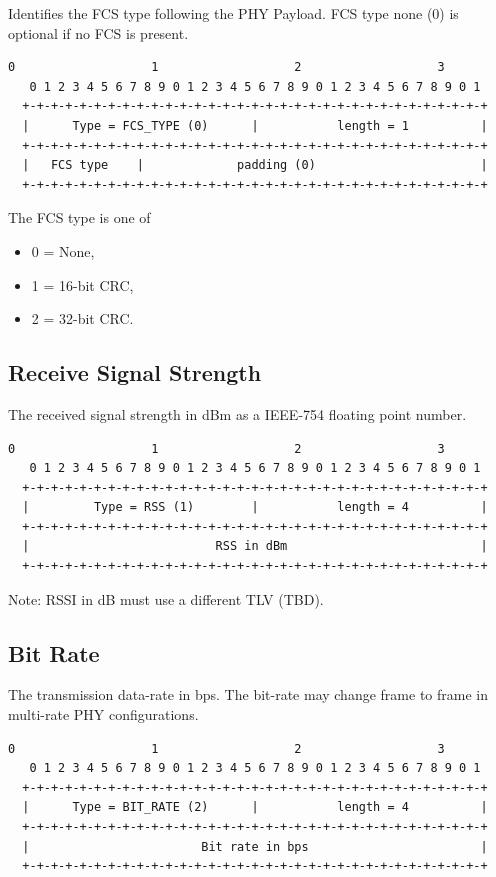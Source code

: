 \documentclass[12pt]{article}
\renewcommand\_{\textunderscore\allowbreak}
\begin{document}
Identifies the FCS type following the PHY Payload.  FCS type none (0) is
optional if no FCS is present.

\begin{Verbatim}[samepage=true]
   0                   1                   2                   3
   0 1 2 3 4 5 6 7 8 9 0 1 2 3 4 5 6 7 8 9 0 1 2 3 4 5 6 7 8 9 0 1
  +-+-+-+-+-+-+-+-+-+-+-+-+-+-+-+-+-+-+-+-+-+-+-+-+-+-+-+-+-+-+-+-+
  |      Type = FCS_TYPE (0)      |           length = 1          |
  +-+-+-+-+-+-+-+-+-+-+-+-+-+-+-+-+-+-+-+-+-+-+-+-+-+-+-+-+-+-+-+-+
  |   FCS type    |             padding (0)                       |
  +-+-+-+-+-+-+-+-+-+-+-+-+-+-+-+-+-+-+-+-+-+-+-+-+-+-+-+-+-+-+-+-+
\end{Verbatim}

The FCS type is one of
    \begin{itemize}
        \item 0 = None,
        \item 1 = 16-bit CRC,
        \item 2 = 32-bit CRC.
    \end{itemize}

\subsection{Receive Signal Strength}
The received signal strength in dBm as a IEEE-754 floating point number.

\begin{Verbatim}[samepage=true]
   0                   1                   2                   3
   0 1 2 3 4 5 6 7 8 9 0 1 2 3 4 5 6 7 8 9 0 1 2 3 4 5 6 7 8 9 0 1
  +-+-+-+-+-+-+-+-+-+-+-+-+-+-+-+-+-+-+-+-+-+-+-+-+-+-+-+-+-+-+-+-+
  |         Type = RSS (1)        |           length = 4          |
  +-+-+-+-+-+-+-+-+-+-+-+-+-+-+-+-+-+-+-+-+-+-+-+-+-+-+-+-+-+-+-+-+
  |                          RSS in dBm                           |
  +-+-+-+-+-+-+-+-+-+-+-+-+-+-+-+-+-+-+-+-+-+-+-+-+-+-+-+-+-+-+-+-+
\end{Verbatim}
Note: RSSI in dB must use a different TLV (TBD).

\newpage
\subsection{Bit Rate}

The transmission data-rate in bps.  The bit-rate may change frame to frame in
multi-rate PHY configurations.

\begin{Verbatim}[samepage=true]
   0                   1                   2                   3
   0 1 2 3 4 5 6 7 8 9 0 1 2 3 4 5 6 7 8 9 0 1 2 3 4 5 6 7 8 9 0 1
  +-+-+-+-+-+-+-+-+-+-+-+-+-+-+-+-+-+-+-+-+-+-+-+-+-+-+-+-+-+-+-+-+
  |      Type = BIT_RATE (2)      |           length = 4          |
  +-+-+-+-+-+-+-+-+-+-+-+-+-+-+-+-+-+-+-+-+-+-+-+-+-+-+-+-+-+-+-+-+
  |                        Bit rate in bps                        |
  +-+-+-+-+-+-+-+-+-+-+-+-+-+-+-+-+-+-+-+-+-+-+-+-+-+-+-+-+-+-+-+-+
\end{Verbatim}
\end{document}

